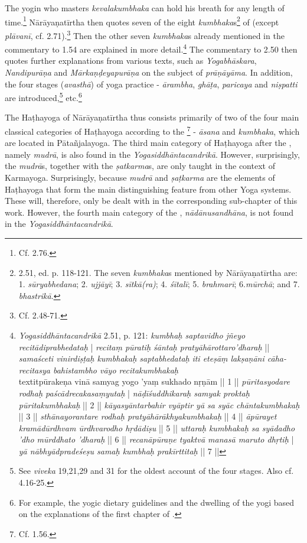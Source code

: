 The yogin who masters \textit{kevalakumbhaka} can hold his breath for any length of time.\footnote{Cf.  2.76.} Nārāyaṇatīrtha then quotes seven of the eight \textit{kumbhaka}s\footnote{ 2.51, ed. p. 118-121. The seven \textit{kumbhaka}s mentioned by Nārāyaṇatīrtha are: 1. \textit{sūryabhedana}; 2. \textit{ujjāyī}; 3. \textit{sītkā(ra)}; 4. \textit{śītalī}; 5. \textit{brahmarī}; 6.\textit{mūrchā}; and 7. \textit{bhastrikā}.} of  (except \textit{plāvanī}, cf.  2.71).\footnote{Cf.  2.48-71.} Then the other seven \textit{kumbhaka}s already mentioned in the commentary to 1.54 are explained in more detail.\footnote{\textit{Yogasiddhāntacandrikā} 2.51, p. 121: \textit{kumbhaḥ saptavidho jñeyo recitādiprabhedataḥ} | \textit{recitaṃ pūratiḥ śāntaḥ pratyāhārottaro'dharaḥ} || \textit{samaśceti vinirdiṣṭaḥ kumbhakaḥ saptabhedataḥ} \textit{iti eteṣāṃ lakṣaṇāni cāha-} \textit{recitasya bahistambho vāyo recitakumbhakaḥ} \\textit{pūrakeṇa vinā samyag yogo 'yaṃ sukhado nṛṇām} || 1 || \textit{pūritasyodare rodhaḥ paścādrecakasaṃyutaḥ} | \textit{nāḍīśuddhikaraḥ samyak proktaḥ pūritakumbhakaḥ} || 2 || \textit{kāyasyāntarbahir vyāptir yā sa syāc chāntakumbhakaḥ} || 3 || \textit{sthānayorantare rodhaḥ pratyāhārākhyakumbhakaḥ} || 4 || \textit{āpūrayet kramādūrdhvam ūrdhvarodho hṛdādiṣu} || 5 || \textit{uttaraḥ kumbhakaḥ sa syādadho 'dho mūrddhato 'dharaḥ} || 6 || \textit{recanāpūraṇe tyaktvā manasā maruto dhṛtiḥ} | \textit{yā nābhyādpradeśeṣu samaḥ kumbhaḥ prakīrttitaḥ} || 7 ||} The commentary to 2.50 then quotes further explanations from various texts, such as \textit{Yogabhāskara}, \textit{Nandipurāṇa} and \textit{Mārkaṇḍeyapurāṇa} on the subject of \textit{prāṇāyāma}. In addition, the four stages (\textit{avasthā}) of yoga practice - \textit{ārambha}, \textit{ghāṭa}, \textit{paricaya} and \textit{niṣpatti} are introduced,\footnote{See  \textit{viveka} 19,21,29 and 31 for the oldest account of the four stages. Also cf.  4.16-25.} etc.\footnote{For example, the yogic dietary guidelines and the dwelling of the yogi based on the explanations of the first chapter of .}

The Haṭhayoga of Nārāyaṇatīrtha thus consists primarily of two of the four main classical categories of Haṭhayoga according to the \footnote{Cf.  1.56.} - \textit{āsana} and \textit{kumbhaka}, which are located in Pātañjalayoga. The third main category of Haṭhayoga after the , namely \textit{mudrā}, is also found in the \textit{Yogasiddhāntacandrikā}. However, surprisingly, the \textit{mudrā}s, together with the \textit{ṣatkarma}s, are only taught in the context of Karmayoga. Surprisingly, because \textit{mudrā} and \textit{ṣaṭkarma} are the elements of Haṭhayoga that form the main distinguishing feature from other Yoga systems. These will, therefore, only be dealt with in the corresponding sub-chapter of this work. However, the fourth main category of the , \textit{nādānusandhāna}, is not found in the \textit{Yogasiddhāntacandrikā}.

